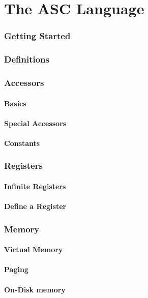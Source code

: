 \documentclass{scrartcl}
\begin{document}
\part{The ASC Language}
    \section{Getting Started}
    \section{Definitions}
    \section{Accessors}
        \subsection{Basics}
        \subsection{Special Accessors}
        \subsection{Constants}
    \section{Registers}
        \subsection{Infinite Registers}
        \subsection{Define a Register}
    \section{Memory}
        \subsection{Virtual Memory}
        \subsection{Paging}
        \subsection{On-Disk memory}
\end{document}
